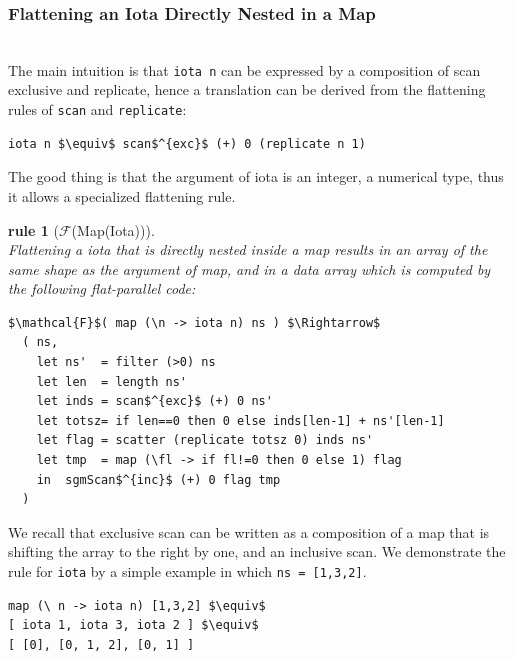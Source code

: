 \documentclass[acmsmall,review]{acmart}\settopmatter{printfolios=true,printccs=false,printacmref=false}
\newtheorem{rewrite}{rule}
\begin{document}
\subsubsection{Flattening an Iota Directly Nested in a Map}
\label{subsubsec:iota-in-map}
$\mbox{ }$\\

The main intuition is that {\tt iota n} can be expressed
by a composition of scan exclusive and replicate, hence a 
translation can be derived from the flattening rules
of \lstinline{scan} and \lstinline{replicate}:
\begin{lstlisting}[mathescape=true]
iota n $\equiv$ scan$^{exc}$ (+) 0 (replicate n 1)
\end{lstlisting}\vspace{-2ex}

The good thing is that the argument of iota is an integer,
a numerical type, thus it allows a specialized flattening rule.

\begin{rewrite}[$\mathcal{F}$(Map(Iota))]\label{Flat-Iota-In-Map}
$\mbox{ }$\\
Flattening a iota that is directly nested inside a map results
in an array of the same shape as the argument of map, and in a
data array which is computed by the following flat-parallel code:
\begin{lstlisting}[mathescape=true]
$\mathcal{F}$( map (\n -> iota n) ns ) $\Rightarrow$
  ( ns,
    let ns'  = filter (>0) ns
    let len  = length ns'
    let inds = scan$^{exc}$ (+) 0 ns'
    let totsz= if len==0 then 0 else inds[len-1] + ns'[len-1]
    let flag = scatter (replicate totsz 0) inds ns'
    let tmp  = map (\fl -> if fl!=0 then 0 else 1) flag
    in  sgmScan$^{inc}$ (+) 0 flag tmp
  )
\end{lstlisting}\vspace{-2ex}
\end{rewrite}

We recall that exclusive scan can be written as a composition
of a map that is shifting the array to the right by one, and 
an inclusive scan. We demonstrate the rule for \lstinline{iota}
by a simple example in which {\tt ns = [1,3,2]}.

\begin{lstlisting}[mathescape=true]
map (\ n -> iota n) [1,3,2] $\equiv$
[ iota 1, iota 3, iota 2 ] $\equiv$
[ [0], [0, 1, 2], [0, 1] ]
\end{lstlisting}\vspace{-2ex}
 
\end{document}
